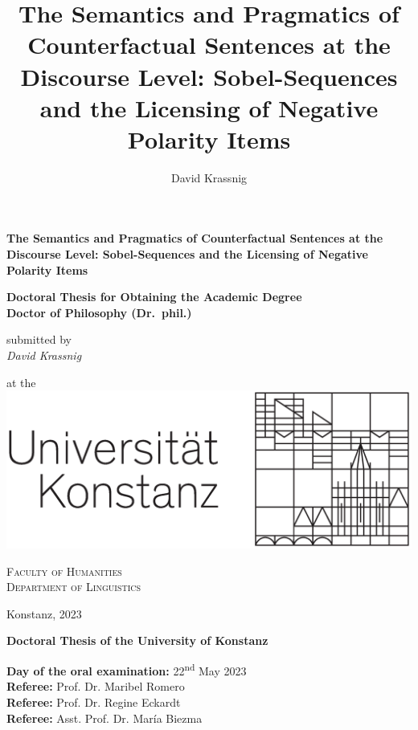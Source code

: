 
\title{The Semantics and Pragmatics of Counterfactual Sentences at the Discourse Level: Sobel-Sequences and the Licensing of Negative Polarity Items}

\author{David Krassnig}






\setul{3pt}{1.5pt}
\begin{titlepage}\doublespacing
\begin{adjustwidth}{-4mm}{-4mm}
\begin{center}
\textbf{\huge The Semantics and Pragmatics of Counterfactual Sentences at the Discourse Level: Sobel-Sequences and the Licensing of Negative Polarity Items}
\end{center}
\end{adjustwidth}

\textbf{\large Doctoral Thesis for Obtaining the Academic Degree\\ Doctor of Philosophy (Dr.~phil.)}

submitted by\\{\large \textit{David Krassnig}}%

at the\\\vspace{-2.5mm}
\includegraphics[scale=0.25]{content/graphics/unikonstanz_signet}


{\large\scshape Faculty of Humanities\\
Department of Linguistics}


Konstanz, 2023
\end{titlepage}
\thispagestyle{empty}
\hbox{}\vfill\begin{flushleft}
\noindent\textbf{{Doctoral Thesis of the University of Konstanz}}

\enlargethispage{3\baselineskip}\noindent\textbf{Day of the oral examination:} 22\textsuperscript{nd} May 2023\\
\textbf{Referee:} Prof. Dr. Maribel Romero\\
\textbf{Referee:} Prof. Dr. Regine Eckardt\\
\textbf{Referee:} Asst. Prof. Dr. María Biezma
\end{flushleft}


